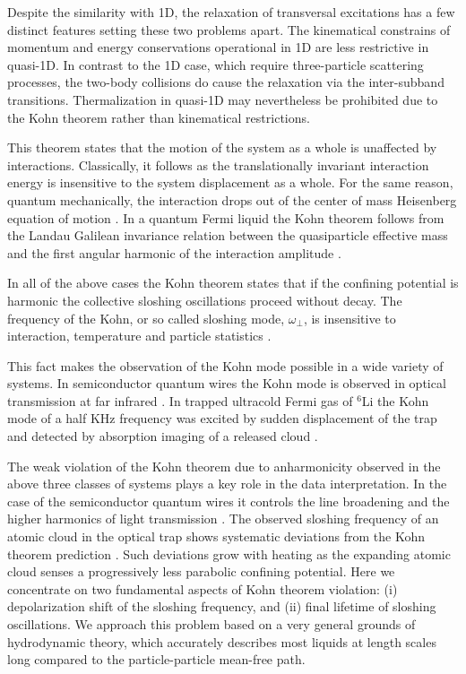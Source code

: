 Despite the similarity with 1D, the relaxation of transversal excitations has a few distinct features setting these two problems apart. The kinematical constrains of momentum and energy conservations operational in 1D are less restrictive in quasi-1D. In contrast to the 1D case, which require three-particle scattering processes, the two-body collisions do cause the relaxation via the inter-subband transitions. Thermalization in quasi-1D may nevertheless be prohibited due to the Kohn theorem rather than kinematical restrictions. 

This theorem states that the motion of the system as a whole is unaffected by interactions.
Classically, it follows as the translationally invariant interaction energy is insensitive to the system displacement as a whole. For the same reason, quantum mechanically, the interaction drops out of the center of mass Heisenberg equation of motion \cite{Dobson1994,Brey1989}. In a quantum Fermi liquid the Kohn theorem follows from the Landau Galilean invariance relation between the quasiparticle effective mass and the first angular harmonic of the interaction amplitude \cite{Iqbal}.

In all of the above cases the Kohn theorem states that if the confining potential is harmonic the collective sloshing oscillations proceed without decay. The frequency of the Kohn, or so called sloshing mode, $\omega_\perp$, is insensitive to interaction, temperature and particle statistics \cite{Dobson1994,Brey1989,Iqbal}. 

This fact makes the observation of the Kohn mode possible in a wide variety of systems. In semiconductor quantum wires the Kohn mode is observed in optical transmission at far infrared \cite{Drexler,Wendler}. In trapped ultracold Fermi gas of $^6$Li the Kohn mode of a half KHz frequency was excited by sudden displacement of the trap and detected by absorption imaging of a released cloud \cite{Altmeyer,Pantel2012}. 

The weak violation of the Kohn theorem due to anharmonicity observed in the above three classes of systems plays a key role in the data interpretation.  In the case of the semiconductor quantum wires it controls the line broadening and the higher harmonics of light transmission \cite{Drexler}. 
The observed sloshing frequency of an atomic cloud in the optical trap shows systematic deviations from the Kohn theorem prediction  \cite{Riedl}. Such deviations grow with heating as the expanding atomic cloud senses a progressively less parabolic confining potential. Here we concentrate on two fundamental aspects of Kohn theorem violation: (i) depolarization shift of the sloshing frequency, and (ii) final lifetime of sloshing oscillations. We approach this problem based on a very general grounds of hydrodynamic theory, which accurately describes most liquids at length scales long compared to the particle-particle mean-free path.


